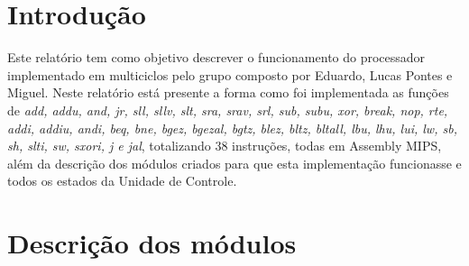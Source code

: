 \documentclass{article}
\begin{document}
    \newpage
    \tableofcontents

    \newpage
    \section{Introdução}
    Este relatório tem como objetivo descrever o funcionamento do processador implementado em multiciclos pelo grupo composto por Eduardo, Lucas Pontes e Miguel. Neste relatório está presente a forma como foi implementada as funções de {\it add, addu, and, jr, sll, sllv, slt, sra, srav, srl, sub, subu, xor, break, nop, rte, addi, addiu, andi, beq, bne, bgez, bgezal, bgtz, blez, bltz, bltall, lbu, lhu, lui, lw, sb, sh, slti, sw, sxori, j e jal}, totalizando 38 instruções, todas em Assembly MIPS, além da descrição dos módulos criados para que esta implementação funcionasse e todos os estados da Unidade de Controle.
    
    \newpage    
    \section{Descrição dos módulos}
    
\end{document}
